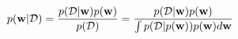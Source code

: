 $$p({\bf w}|{\cal D})=\frac{p({\cal D}|{\bf w})p({\bf w})}{p({\cal D})}
=\frac{p({\cal D}|{\bf w})p({\bf w})}{\int{p({\cal D}|p({\bf w}))p({\bf w})d{\bf w}}}$$
